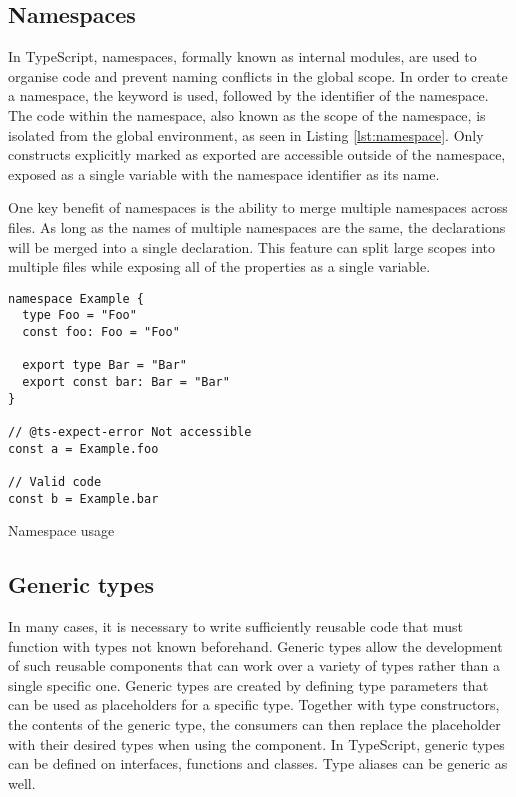 \subsection{Namespaces}

In TypeScript, namespaces, formally known as internal modules, are used to organise code and prevent naming conflicts in the global scope. In order to create a namespace, the  keyword is used, followed by the identifier of the namespace. The code within the namespace, also known as the scope of the namespace, is isolated from the global environment, as seen in Listing \ref{lst:namespace}. Only constructs explicitly marked as exported are accessible outside of the namespace, exposed as a single variable with the namespace identifier as its name.

One key benefit of namespaces is the ability to merge multiple namespaces across files. As long as the names of multiple namespaces are the same, the declarations will be merged into a single declaration. This feature can split large scopes into multiple files while exposing all of the properties as a single variable.

\clearpage

\begin{listing}[ht]
  \begin{verbatim}
namespace Example {
  type Foo = "Foo"
  const foo: Foo = "Foo"
  
  export type Bar = "Bar"
  export const bar: Bar = "Bar"
}

// @ts-expect-error Not accessible
const a = Example.foo 

// Valid code
const b = Example.bar
\end{verbatim}
  \caption{Namespace usage}\label{lst:namespace}
\end{listing}

\subsection{Generic types}

In many cases, it is necessary to write sufficiently reusable code that must function with types not known beforehand. Generic types allow the development of such reusable components that can work over a variety of types rather than a single specific one. Generic types are created by defining type parameters that can be used as placeholders for a specific type. Together with type constructors, the contents of the generic type, the consumers can then replace the placeholder with their desired types when using the component. In TypeScript, generic types can be defined on interfaces, functions and classes. Type aliases can be generic as well.


